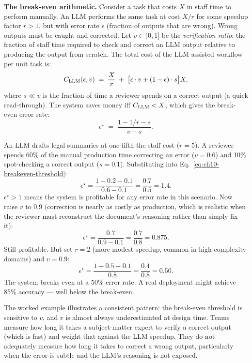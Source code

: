 \textbf{The break-even arithmetic.} Consider a task that costs
$X$ in staff time to perform manually. An LLM performs the same
task at cost $X/r$ for some speedup factor $r > 1$, but with
error rate $\epsilon$ (fraction of outputs that are wrong).
Wrong outputs must be caught and corrected. Let $v \in (0, 1]$
be the \emph{verification ratio}: the fraction of staff time
required to check and correct an LLM output relative to
producing the output from scratch. The total cost of the
LLM-assisted workflow per unit task is:
\begin{equation}
  C_{\rm LLM}(\epsilon, v)
  \;=\; \frac{X}{r}
        \;+\; \bigl[\epsilon \cdot v + (1 - \epsilon) \cdot s\bigr] X,
  \label{eq:ch10-breakeven}
\end{equation}
where $s \ll v$ is the fraction of time a reviewer spends on a
correct output (a quick read-through). The system saves money
iff $C_{\rm LLM} < X$, which gives the break-even error rate:
\begin{equation}
  \epsilon^{\star}
  \;=\; \frac{1 - 1/r - s}{v - s}.
  \label{eq:ch10-breakeven-threshold}
\end{equation}

\begin{workedexample}[: document drafting at $r = 5$]
An LLM drafts legal summaries at one-fifth the staff cost
($r = 5$). A reviewer spends 60\% of the manual production
time correcting an error ($v = 0.6$) and 10\% spot-checking
a correct output ($s = 0.1$). Substituting into
Eq.~\eqref{eq:ch10-breakeven-threshold}:
\[
  \epsilon^{\star}
  = \frac{1 - 0.2 - 0.1}{0.6 - 0.1}
  = \frac{0.7}{0.5}
  = 1.4.
\]
$\epsilon^\star > 1$ means the system is profitable for any
error rate in this scenario. Now raise $v$ to 0.9 (correction
is nearly as costly as production, which is realistic when the
reviewer must reconstruct the document's reasoning rather than
simply fix it):
\[
  \epsilon^{\star}
  = \frac{0.7}{0.9 - 0.1}
  = \frac{0.7}{0.8}
  = 0.875.
\]
Still profitable. But set $r = 2$ (more modest speedup, common
in high-complexity domains) and $v = 0.9$:
\[
  \epsilon^{\star}
  = \frac{1 - 0.5 - 0.1}{0.8}
  = \frac{0.4}{0.8}
  = 0.50.
\]
The system breaks even at a 50\% error rate. A real deployment
might achieve 85\% accuracy --- well below the break-even.
\end{workedexample}

The worked example illustrates a consistent pattern: the
break-even threshold is sensitive to $v$, and $v$ is almost
always underestimated at design time. Teams measure how long it
takes a subject-matter expert to verify a correct output
(which is fast) and weight that against the LLM speedup. They
do not adequately measure how long it takes to correct a
wrong output, particularly when the error is subtle and
the LLM's reasoning is not exposed.

